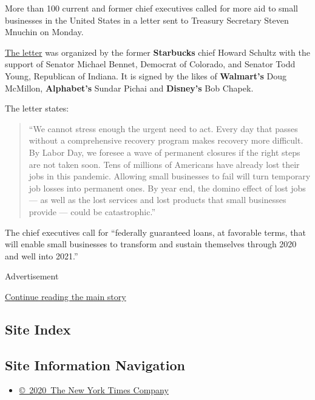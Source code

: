 More than 100 current and former chief executives called for more aid to
small businesses in the United States in a letter sent to Treasury
Secretary Steven Mnuchin on Monday.

\href{https://www.howardschultz.com/lettertocongress/}{The letter} was
organized by the former \textbf{Starbucks} chief Howard Schultz with the
support of Senator Michael Bennet, Democrat of Colorado, and Senator
Todd Young, Republican of Indiana. It is signed by the likes of
\textbf{Walmart's} Doug McMillon, \textbf{Alphabet's} Sundar Pichai and
\textbf{Disney's} Bob Chapek.

The letter states:

\begin{quote}
``We cannot stress enough the urgent need to act. Every day that passes
without a comprehensive recovery program makes recovery more difficult.
By Labor Day, we foresee a wave of permanent closures if the right steps
are not taken soon. Tens of millions of Americans have already lost
their jobs in this pandemic. Allowing small businesses to fail will turn
temporary job losses into permanent ones. By year end, the domino effect
of lost jobs --- as well as the lost services and lost products that
small businesses provide --- could be catastrophic.''
\end{quote}

The chief executives call for ``federally guaranteed loans, at favorable
terms, that will enable small businesses to transform and sustain
themselves through 2020 and well into 2021.''

Advertisement

\protect\hyperlink{after-bottom}{Continue reading the main story}

\hypertarget{site-index}{%
\subsection{Site Index}\label{site-index}}

\hypertarget{site-information-navigation}{%
\subsection{Site Information
Navigation}\label{site-information-navigation}}

\begin{itemize}
\tightlist
\item
  \href{https://help.nytimes.com/hc/en-us/articles/115014792127-Copyright-notice}{©~2020~The
  New York Times Company}
\end{itemize}

